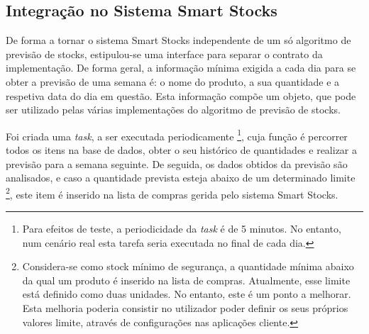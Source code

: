 %
%
\subsection{Integração no Sistema Smart Stocks}\label{subsec342}

De forma a tornar o sistema Smart Stocks independente de um só algoritmo de previsão de stocks, estipulou-se uma interface para separar o contrato da implementação. De forma geral, a informação mínima exigida a cada dia para se obter a previsão de uma semana é: o nome do produto, a sua quantidade e a respetiva data do dia em questão. Esta informação compõe um objeto, que pode ser utilizado pelas várias implementações do algoritmo de previsão de stocks.

Foi criada uma \textit{task}, a ser executada periodicamente \footnote{Para efeitos de teste, a periodicidade da \textit{task} é de 5 minutos. No entanto, num cenário real esta tarefa seria executada no final de cada dia.}, cuja função é percorrer todos os itens na base de dados, obter o seu histórico de quantidades e realizar a previsão para a semana seguinte. De seguida, os dados obtidos da previsão são analisados, e caso a quantidade prevista esteja abaixo de um determinado limite \footnote{Considera-se como stock mínimo de segurança, a quantidade mínima abaixo da qual um produto é inserido na lista de compras. Atualmente, esse limite está definido como duas unidades. No entanto, este é um ponto a melhorar. Esta melhoria poderia consistir no utilizador poder definir os seus próprios valores limite,  através de configurações nas aplicações cliente.}, este item é inserido na lista de compras gerida pelo sistema Smart Stocks. 
